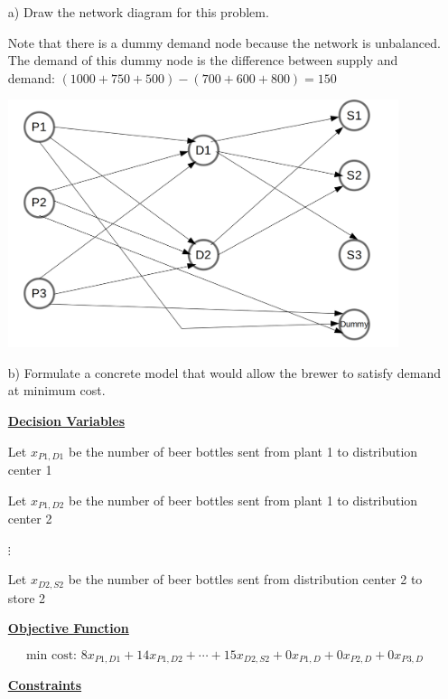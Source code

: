 \documentclass[11pt]{article}
\theoremstyle{definition}
\newcommand{\blu}{\color{blue}}
\begin{document}
\begin{enumerate}
\item[a)] Draw the network diagram for this problem.

Note that there is a dummy demand node because the network is unbalanced. The demand of this dummy node is the difference between supply and demand: $(1000+750+500)-(700+600+800) = 150$

\begin{center}
\includegraphics[width=0.9\textwidth]{Prob2.png}
\end{center}

\item[b)] Formulate a concrete model that would allow the brewer to satisfy demand at minimum cost.

{\blu

\textbf{\underline{Decision Variables}}

Let $x_{P1,D1}$ be the number of beer bottles sent from plant 1 to distribution center 1

Let $x_{P1,D2}$ be the number of beer bottles sent from plant 1 to distribution center 2

$\vdots$

Let $x_{D2,S2}$ be the number of beer bottles sent from distribution center 2 to store 2

\textbf{\underline{Objective Function}}

\[
\text{min cost: } 8 x_{P1,D1} + 14 x_{P1,D2} + \cdots + 15 x_{D2,S2} + 0 x_{P1,D} + 0 x_{P2,D} + 0 x_{P3,D}
\]

\textbf{\underline{Constraints}}

}
\end{enumerate}
\end{document}
